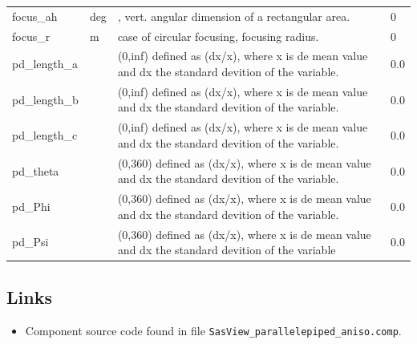 \begin{longtable}{p{}p{}p{}p{}}
focus\_ah & deg & , vert. angular dimension of a rectangular area. & 0 \\
focus\_r & m & case of circular focusing, focusing radius. & 0 \\
pd\_length\_a &  & (0,inf) defined as (dx/x), where x is de mean value and dx the standard devition of the variable. & 0.0 \\
pd\_length\_b &  & (0,inf) defined as (dx/x), where x is de mean value and dx the standard devition of the variable. & 0.0 \\
pd\_length\_c &  & (0,inf) defined as (dx/x), where x is de mean value and dx the standard devition of the variable. & 0.0 \\
pd\_theta &  & (0,360) defined as (dx/x), where x is de mean value and dx the standard devition of the variable. & 0.0 \\
pd\_Phi &  & (0,360) defined as (dx/x), where x is de mean value and dx the standard devition of the variable. & 0.0 \\
pd\_Psi &  & (0,360) defined as (dx/x), where x is de mean value and dx the standard devition of the variable & 0.0 \\
\bottomrule
\end{longtable}

\subsection*{Links}
\begin{itemize}
  \item Component source code found in file \texttt{SasView\_parallelepiped\_aniso.comp}.
\end{itemize}
